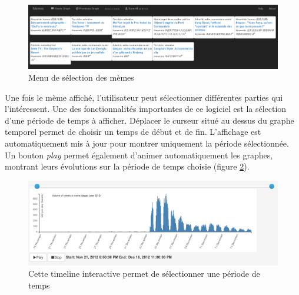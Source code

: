     \begin{figure}[htpb]
        \centering
        \includegraphics[scale=0.3]{figures/chap4/ui/ui-menu.png}
        \caption{Menu de sélection des mèmes}
        \label{fig:ui-menu}
    \end{figure}

    Une fois le mème affiché, l'utilisateur peut sélectionner différentes parties qui l'intéressent. Une des fonctionnalités importantes de ce logiciel est la sélection d'une période de temps à afficher. Déplacer le curseur situé au dessus du graphe temporel permet de choisir un temps de début et de fin. L'affichage est automatiquement mis à jour pour montrer uniquement la période sélectionnée. Un bouton \textit{play} permet également d'animer automatiquement les graphes, montrant leurs évolutions sur la période de temps choisie (figure \ref{fig:ui-timeline}).

    \begin{figure}[htpb]
        \centering
        \includegraphics[scale=0.4]{figures/chap4/ui/ui-timeline.png}
        \caption{Cette timeline interactive permet de sélectionner une période de temps}
        \label{fig:ui-timeline}
    \end{figure}

